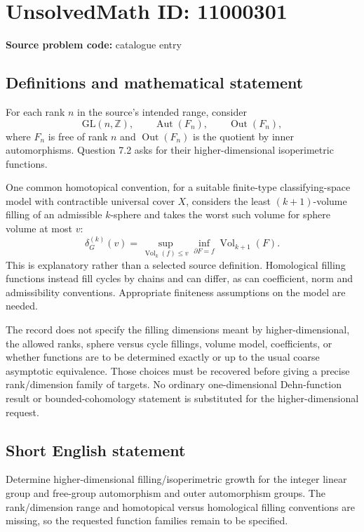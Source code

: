 \documentclass[11pt]{article}
\newcommand{\Z}{\mathbb{Z}}
\begin{document}
\section*{UnsolvedMath ID: 11000301}
\textbf{Source problem code:} catalogue entry
\subsection{Definitions and mathematical statement}
For each rank \(n\) in the source's intended range, consider
\[
 \mathrm{GL}(n,\Z),\qquad\operatorname{Aut}(F_n),\qquad
 \operatorname{Out}(F_n),
\]
where \(F_n\) is free of rank \(n\) and \(\operatorname{Out}(F_n)\) is the quotient by inner automorphisms. Question 7.2 asks for their higher-dimensional isoperimetric functions.

One common homotopical convention, for a suitable finite-type classifying-space model with contractible universal cover \(X\), considers the least \((k+1)\)-volume filling of an admissible \(k\)-sphere and takes the worst such volume for sphere volume at most \(v\):
\[
 \delta_G^{(k)}(v)=
 \sup_{\operatorname{Vol}_k(f)\le v}
       \inf_{\partial F=f}\operatorname{Vol}_{k+1}(F).
\]
This is explanatory rather than a selected source definition. Homological filling functions instead fill cycles by chains and can differ, as can coefficient, norm and admissibility conventions. Appropriate finiteness assumptions on the model are needed.

The record does not specify the filling dimensions meant by higher-dimensional, the allowed ranks, sphere versus cycle fillings, volume model, coefficients, or whether functions are to be determined exactly or up to the usual coarse asymptotic equivalence. Those choices must be recovered before giving a precise rank/dimension family of targets. No ordinary one-dimensional Dehn-function result or bounded-cohomology statement is substituted for the higher-dimensional request.
\subsection{Short English statement}
Determine higher-dimensional filling/isoperimetric growth for the integer linear group and free-group automorphism and outer automorphism groups. The rank/dimension range and homotopical versus homological filling conventions are missing, so the requested function families remain to be specified.
\end{document}
